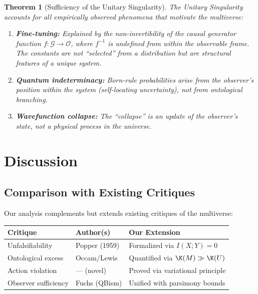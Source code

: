 \documentclass[12pt, a4paper]{article}
\theoremstyle{plain}
\newtheorem{theorem}{Theorem}[section]
\theoremstyle{definition}
\begin{document}
\begin{theorem}[Sufficiency of the Unitary Singularity]\label{thm:sufficiency}
  The Unitary Singularity accounts for all empirically observed phenomena
  that motivate the multiverse:
  \begin{enumerate}[label=(\alph*)]
    \item \textbf{Fine-tuning:} Explained by the non-invertibility of the
      causal generator function $f: \mathcal{G} \to \mathcal{O}$, where
      $f^{-1}$ is undefined from within the observable frame. The
      constants are not ``selected'' from a distribution but are
      structural features of a unique system.
    \item \textbf{Quantum indeterminacy:} Born-rule probabilities arise
      from the observer's position within the system (self-locating
      uncertainty), not from ontological branching.
    \item \textbf{Wavefunction collapse:} The ``collapse'' is an update
      of the observer's state, not a physical process in the universe.
  \end{enumerate}
\end{theorem}

\section{Discussion}\label{sec:discussion}

\subsection{Comparison with Existing Critiques}

Our analysis complements but extends existing critiques of the multiverse:

\begin{center}
\begin{tabular}{lll}
  \toprule
  \textbf{Critique} & \textbf{Author(s)} & \textbf{Our Extension} \\
  \midrule
  Unfalsifiability & Popper (1959) & Formalized via $I(X;Y)=0$ \\
  Ontological excess & Occam/Lewis & Quantified via $\K(M) \gg \K(U)$ \\
  Action violation & --- (novel) & Proved via variational principle \\
  Observer sufficiency & Fuchs (QBism) & Unified with parsimony bounds \\
  \bottomrule
\end{tabular}
\end{center}
\end{document}
